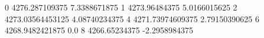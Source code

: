 0 4276.287109375 7.3388671875
1 4273.96484375 5.0166015625
2 4273.03564453125 4.08740234375
4 4271.73974609375 2.79150390625
6 4268.9482421875 0.0
8 4266.65234375 -2.2958984375
